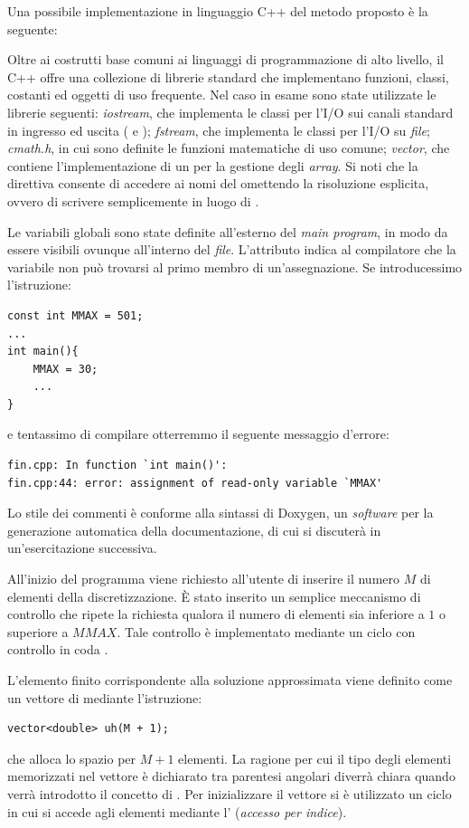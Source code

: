 Una possibile implementazione in linguaggio C++ del metodo proposto \`e la
seguente:
\lstset{basicstyle=\scriptsize\sf}

\lstset{basicstyle=\sf}

Oltre ai costrutti base comuni ai linguaggi di programmazione di alto
livello, il C++ offre una collezione di librerie standard che
implementano funzioni, classi, costanti ed oggetti di uso
frequente. Nel caso in esame sono state utilizzate le librerie
seguenti: \emph{iostream}, che implementa le classi per l'I/O sui
canali standard in ingresso ed uscita ( e
); \emph{fstream}, che implementa le classi per
l'I/O su \emph{file}; \emph{cmath.h}, in cui sono definite le funzioni
matematiche di uso comune; \emph{vector}, che contiene
l'implementazione di un   per la
gestione degli \emph{array}. Si noti che la direttiva   consente di accedere ai nomi del 
 omettendo la risoluzione esplicita, ovvero di scrivere
semplicemente  in luogo di .

Le variabili globali sono state definite all'esterno del \emph{main
program}, in modo da essere visibili ovunque all'interno del
\emph{file}. L'attributo  indica al compilatore che la
variabile non pu\`o trovarsi al primo membro di un'assegnazione. Se
introducessimo l'istruzione: 
\lstset{basicstyle=\scriptsize\sf}
\begin{lstlisting}
const int MMAX = 501;
...
int main(){     
    MMAX = 30;
    ...
}
\end{lstlisting}
\lstset{basicstyle=\sf}
e tentassimo di compilare otterremmo il seguente messaggio d'errore:
\begin{verbatim}
fin.cpp: In function `int main()':
fin.cpp:44: error: assignment of read-only variable `MMAX'
\end{verbatim}
Lo stile dei commenti \`e conforme alla sintassi di Doxygen, un
\emph{software} per la generazione automatica della documentazione, di
cui si discuter\`a in un'esercitazione successiva.

All'inizio del programma viene richiesto all'utente di inserire il
numero $M$ di elementi della discretizzazione. \`E stato inserito un
semplice meccanismo di controllo che ripete la richiesta qualora il
numero di elementi sia inferiore a $1$ o superiore a $MMAX$. Tale
controllo \`e implementato mediante un ciclo con controllo in coda
.

L'elemento finito corrispondente alla soluzione approssimata viene
definito come un vettore di  mediante l'istruzione:
\lstset{basicstyle=\scriptsize\sf}
\begin{lstlisting}
vector<double> uh(M + 1);
\end{lstlisting}
\lstset{basicstyle=\sf}
che alloca lo spazio per $M+1$ elementi. La ragione per cui il tipo
degli elementi memorizzati nel vettore \`e dichiarato tra parentesi
angolari diverr\`a chiara quando verr\`a introdotto il concetto di
. Per inizializzare il vettore si \`e utilizzato un
ciclo  in cui si accede agli elementi mediante
l' (\emph{accesso per indice}).

